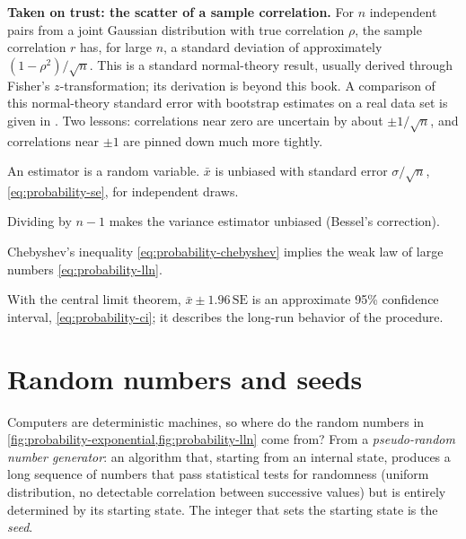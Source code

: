 \begin{beyond}
\textbf{Taken on trust: the scatter of a sample correlation.} For $n$ independent pairs from a joint Gaussian distribution with true correlation $\rho$, the sample correlation $r$ has, for large $n$, a standard deviation of approximately $(1-\rho^2)/\sqrt n$. This is a standard normal-theory result, usually derived through Fisher's $z$-transformation; its derivation is beyond this book. A comparison of this normal-theory standard error with bootstrap estimates on a real data set is given in \cite{efron}. Two lessons: correlations near zero are uncertain by about $\pm1/\sqrt n$, and correlations near $\pm1$ are pinned down much more tightly.
\end{beyond}

\begin{keyideas}

\item An estimator is a random variable. $\bar x$ is unbiased with standard error $\sigma/\sqrt n$, \cref{eq:probability-se}, for independent draws.
\item Dividing by $n-1$ makes the variance estimator unbiased (Bessel's correction).
\item Chebyshev's inequality \cref{eq:probability-chebyshev} implies the weak law of large numbers \cref{eq:probability-lln}.
\item With the central limit theorem, $\bar x\pm1.96\,\mathrm{SE}$ is an approximate 95\% confidence interval, \cref{eq:probability-ci}; it describes the long-run behavior of the procedure.

\end{keyideas}

\section{Random numbers and seeds}\label{sec:probability-rng}

Computers are deterministic machines, so where do the random numbers in \cref{fig:probability-exponential,fig:probability-lln} come from? From a \emph{pseudo-random number generator}: an algorithm that, starting from an internal state, produces a long sequence of numbers that pass statistical tests for randomness (uniform distribution, no detectable correlation between successive values) but is entirely determined by its starting state. The integer that sets the starting state is the \emph{seed}.

